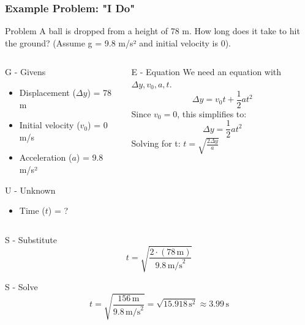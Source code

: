 \documentclass{beamer}
\begin{document}
\begin{frame}[allowframebreaks]
    \frametitle{Example Problem: "I Do"}
    \begin{block}{Problem}
        A ball is dropped from a height of 78 m. How long does it take to hit the ground? (Assume g = 9.8 m/s² and initial velocity is 0).
    \end{block}
    
    \begin{columns}[T]
        \begin{column}{0.5\textwidth}
            \begin{alertblock}{G - Givens}
                \begin{itemize}
                    \item Displacement ($\Delta y$) = 78 m
                    \item Initial velocity ($v_0$) = 0 m/s
                    \item Acceleration ($a$) = 9.8 m/s²
                \end{itemize}
            \end{alertblock}
            \begin{alertblock}{U - Unknown}
                \begin{itemize}
                    \item Time ($t$) = ?
                \end{itemize}
            \end{alertblock}
        \end{column}
        \begin{column}{0.5\textwidth}
            \begin{alertblock}{E - Equation}
                We need an equation with $\Delta y, v_0, a, t$.
                \[ \Delta y = v_0 t + \frac{1}{2} a t^2 \]
                Since $v_0 = 0$, this simplifies to:
                \[ \Delta y = \frac{1}{2} a t^2 \]
                Solving for t:  $t = \sqrt{\frac{2\Delta y}{a}}$
            \end{alertblock}
        \end{column}
    \end{columns}
    
    \begin{alertblock}{S - Substitute}
        \[ t = \sqrt{\frac{2 \cdot (78 \, \text{m})}{9.8 \, \text{m/s}^2}} \]
    \end{alertblock}
    
    \begin{alertblock}{S - Solve}
        \[ t = \sqrt{\frac{156 \, \text{m}}{9.8 \, \text{m/s}^2}} = \sqrt{15.918 \, \text{s}^2} \approx 3.99 \, \text{s} \]
        \begin{center}
        \end{center}
    \end{alertblock}
\end{frame}
\end{document}
